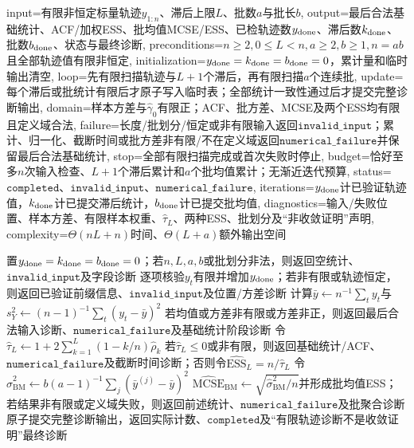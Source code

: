 \begin{AlgorithmContract}{
  input={有限非恒定标量轨迹$y_{1:n}$、滞后上限$L$、批数$a$与批长$b$},
  output={最后合法基础统计、ACF/加权ESS、批均值MCSE/ESS、已检轨迹数$y_{\rm done}$、滞后数$k_{\rm done}$、批数$b_{\rm done}$、状态与最终诊断},
  preconditions={$n\ge2,0\le L<n,a\ge2,b\ge1,n=ab$且全部轨迹值有限非恒定},
  initialization={$y_{\rm done}=k_{\rm done}=b_{\rm done}=0$，累计量和临时输出清空},
  loop={先有限扫描轨迹与$L+1$个滞后，再有限扫描$a$个连续批},
  update={每个滞后或批统计有限后才原子写入临时表；全部统计一致性通过后才提交完整诊断输出},
  domain={样本方差与$\widehat\gamma_0$有限正；ACF、批方差、MCSE及两个ESS均有限且定义域合法},
  failure={长度/批划分/恒定或非有限输入返回$\mathtt{invalid\_input}$；累计、归一化、截断时间或批方差非有限/不在定义域返回$\mathtt{numerical\_failure}$并保留最后合法基础统计},
  stop={全部有限扫描完成或首次失败时停止},
  budget={恰好至多$n$次输入检查、$L+1$个滞后累计和$a$个批均值累计；无渐近迭代预算},
  status={$\mathtt{completed}$、$\mathtt{invalid\_input}$、$\mathtt{numerical\_failure}$},
  iterations={$y_{\rm done}$计已验证轨迹值，$k_{\rm done}$计已提交滞后统计，$b_{\rm done}$计已提交批均值},
  diagnostics={输入/失败位置、样本方差、有限样本权重、$\widehat\tau_L$、两种ESS、批划分及“非收敛证明”声明},
  complexity={$\Theta(nL+n)$时间、$\Theta(L+a)$额外输出空间}
}
\begin{algorithm}[tbp]
\caption{有限样本权重与批均值并列的轨迹诊断}\label{alg:V5-C03-trace-diagnostics}
置$y_{\rm done}=k_{\rm done}=b_{\rm done}=0$；若$n,L,a,b$或批划分非法，则返回空统计、$\mathtt{invalid\_input}$及字段诊断\;
逐项核验$y_t$有限并增加$y_{\rm done}$；若非有限或轨迹恒定，则返回已验证前缀信息、$\mathtt{invalid\_input}$及位置/方差诊断\;
计算$\bar y\leftarrow n^{-1}\sum_ty_t$与$s_Y^2\leftarrow(n-1)^{-1}\sum_t(y_t-\bar y)^2$\;
若均值或方差非有限或方差非正，则返回最后合法输入诊断、$\mathtt{numerical\_failure}$及基础统计阶段诊断\;
令$\widehat\tau_L\leftarrow1+2\sum_{k=1}^L(1-k/n)\widehat\rho_k$\;
若$\widehat\tau_L\le0$或非有限，则返回基础统计/ACF、$\mathtt{numerical\_failure}$及截断时间诊断；否则令$\widehat{\mathrm{ESS}}_L=n/\widehat\tau_L$\;
令$\widehat\sigma_{\mathrm{BM}}^2\leftarrow b(a-1)^{-1}\sum_j(\bar y^{(j)}-\bar y)^2$\;
$\widehat{\mathrm{MCSE}}_{\mathrm{BM}}\leftarrow\sqrt{\widehat\sigma_{\mathrm{BM}}^2/n}$并形成批均值ESS；若结果非有限或定义域失败，则返回前述统计、$\mathtt{numerical\_failure}$及批聚合诊断\;
原子提交完整诊断输出，返回实际计数、$\mathtt{completed}$及“有限轨迹诊断不是收敛证明”最终诊断\;
\end{algorithm}
\end{AlgorithmContract}
